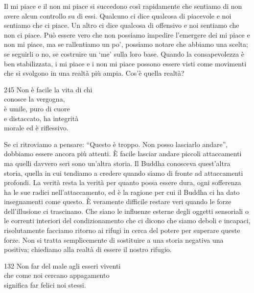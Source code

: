 \begin{dhpRefl}
  Il mi piace e il non mi piace si succedono così rapidamente che sentiamo di
  non avere alcun controllo su di essi. Qualcuno ci dice qualcosa di piacevole e
  noi sentiamo che ci piace. Un altro ci dice qualcosa di offensivo e noi
  sentiamo che non ci piace. Può essere vero che non possiamo impedire
  l'emergere dei mi piace e non mi piace, ma se rallentiamo un po', possiamo
  notare che abbiamo una scelta; se seguirli o no, se costruire un `me' sulla
  loro base. Quando la consapevolezza è ben stabilizzata, i mi piace e i non mi
  piace possono essere visti come movimenti che si svolgono in una realtà più
  ampia. Cos'è quella realtà?
\end{dhpRefl}


\begin{dhpVerse}{245}
\label{dhp-245}
Non è facile la vita di chi\\
conosce la vergogna,\\
è umile, puro di cuore\\
e distaccato, ha integrità\\
morale ed è riflessivo.
\end{dhpVerse}

\begin{dhpRefl}
  Se ci ritroviamo a pensare: ``Questo è troppo. Non
  posso lasciarlo andare'', dobbiamo essere ancora più attenti. È facile lasciar
  andare piccoli attaccamenti ma quelli davvero seri sono un'altra storia. Il
  Buddha conosceva quest'altra storia, quella in cui tendiamo a credere quando
  siamo di fronte ad attaccamenti profondi. La verità resta la verità per quanto
  possa essere dura, ogni sofferenza ha le sue radici nell'attaccamento, ed è la
  ragione per cui il Buddha ci ha dato insegnamenti come questo. È veramente
  difficile restare veri quando le forze dell'illusione ci trascinano. Che siano
  le influenze esterne degli oggetti sensoriali o le correnti interiori del
  condizionamento che ci dicono che siamo deboli e incapaci, risolutamente
  facciamo ritorno ai rifugi in cerca del potere per superare queste forze. Non
  si tratta semplicemente di sostituire a una storia negativa una positiva;
  chiediamo alla realtà di essere il nostro rifugio.
\end{dhpRefl}


\begin{dhpVerse}{132}
\label{dhp-132}
Non far del male agli esseri viventi\\
che come noi cercano appagamento\\
significa far felici noi stessi.
\end{dhpVerse}

